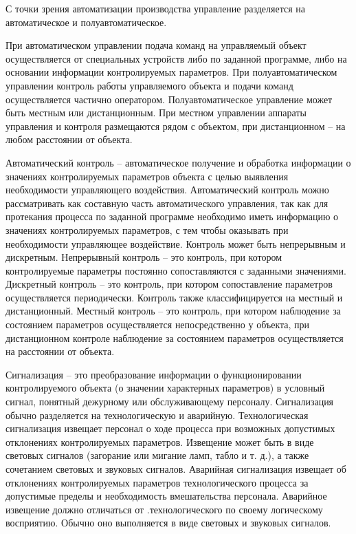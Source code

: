 С точки зрения автоматизации производства управление разделяется на автоматическое и полуавтоматическое.

При автоматическом управлении подача команд на управляемый объект осуществляется от специальных устройств либо по заданной программе, либо на основании информации контролируемых параметров. При полуавтоматическом управлении контроль работы управляемого объекта и подачи команд осуществляется частично оператором. Полуавтоматическое управление может быть местным или дистанционным. При местном управлении аппараты управления и контроля размещаются рядом с объектом, при дистанционном -- на любом расстоянии от объекта.

Автоматический контроль -- автоматическое получение и обработка информации о значениях контролируемых параметров объекта с целью выявления необходимости управляющего воздействия. Автоматический контроль можно рассматривать как составную часть автоматического управления, так как для протекания процесса по заданной программе необходимо иметь информацию о значениях контролируемых параметров, с тем чтобы оказывать при необходимости управляющее воздействие. Контроль может быть непрерывным и дискретным. Непрерывный контроль -- это контроль, при котором контролируемые параметры постоянно сопоставляются с заданными значениями. Дискретный контроль -- это контроль, при котором сопоставление параметров осуществляется периодически. Контроль также классифицируется на местный и дистанционный. Местный контроль -- это контроль, при котором наблюдение за состоянием параметров осуществляется непосредственно у объекта, при дистанционном контроле наблюдение за состоянием параметров осуществляется на расстоянии от объекта.

Сигнализация -- это преобразование информации о функционировании контролируемого объекта (о значении характерных параметров) в условный сигнал, понятный дежурному или обслуживающему персоналу. Сигнализация обычно разделяется на технологическую и аварийную. Технологическая сигнализация извещает персонал о ходе процесса при возможных допустимых отклонениях контролируемых параметров. Извещение может быть в виде световых сигналов (загорание или мигание ламп, табло и т. д.), а также сочетанием световых и звуковых сигналов. Аварийная сигнализация извещает об отклонениях контролируемых параметров технологического процесса за допустимые пределы и необходимость вмешательства персонала. Аварийное извещение должно отличаться от .технологического по своему логическому восприятию. Обычно оно выполняется в виде световых и звуковых сигналов.

